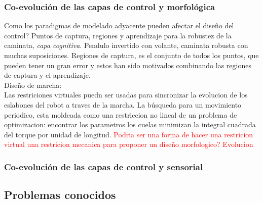 \documentclass[10pt,onecolumn,twoside,letterpaper]{article}
\begin{document}
\subsubsection{Co-evoluci\'on de las capas de control y morfol\'ogica}
Como los paradigmas de modelado adyacente pueden afectar el dise\~no del control? Puntos de captura, regiones y aprendizaje para la robustez de la caminata, \emph{capa cognitiva}. Pendulo invertido con volante, caminata robusta con muchas suposiciones. Regiones de captura, es el conjunto de todos los puntos, que pueden tener un gran error y estos han sido motivados combinando las regiones de captura y el aprendizaje.\\
Dise\~no de marcha:\\
Las restriciones virtuales puedn ser usadas para sincronizar la evolucion de los eslabones del robot a traves de la marcha.
La b\'usqueda para un movimiento periodico, esta moldeada como una restriccion no lineal de un problema de optimizacion: encontrar los parametros los cuelas minimizan la integral cuadrada del torque por unidad de longitud. \textcolor{red}{Podria ser una forma de hacer una restricion virtual una restricion mecanica para proponer un dise\~no morfologico? Evolucion}\\
\href{run:/home/jackmaster/Downloads/[2014 Jessy W Grizzle and Christine  Chevallereau and Ryan  W Sinner and Aaron D Ames] Art Survey  paper: Models, feedback control and open problems of 3D bipedal robotic walking.pdf}{
}\cite{Grizzle2014}
\subsubsection{Co-evoluci\'on de las capas de control y sensorial}
\subsection{Problemas conocidos}
\nocite{*}

\end{document}
